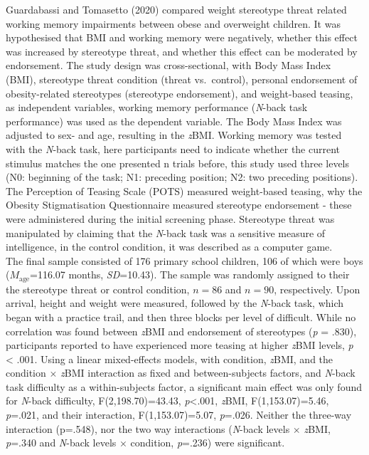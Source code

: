 \documentclass[
  stu,floatsintext]{apa7}
\begin{document}
Guardabassi and Tomasetto (2020) compared weight stereotype threat related working memory impairments between obese and overweight children.
It was hypothesised that BMI and working memory were negatively, whether this effect was increased by stereotype threat, and whether this effect can be moderated by endorsement.
The study design was cross-sectional, with Body Mass Index (BMI), stereotype threat condition (threat vs.~control), personal endorsement of obesity-related stereotypes (stereotype endorsement), and weight-based teasing, as independent variables, working memory performance (\emph{N}-back task performance) was used as the dependent variable.
The Body Mass Index was adjusted to sex- and age, resulting in the \emph{z}BMI.
Working memory was tested with the \emph{N}-back task, here participants need to indicate whether the current stimulus matches the one presented n trials before, this study used three levels (N0: beginning of the task; N1: preceding position; N2: two preceding positions).
The Perception of Teasing Scale (POTS) measured weight-based teasing, why the Obesity Stigmatisation Questionnaire measured stereotype endorsement - these were administered during the initial screening phase.
Stereotype threat was manipulated by claiming that the \emph{N}-back task was a sensitive measure of intelligence, in the control condition, it was described as a computer game.\\
The final sample consisted of 176 primary school children, 106 of which were boys (\(M_{\text{age}}\)=116.07 months, \emph{SD}=10.43).
The sample was randomly assigned to their the stereotype threat or control condition, \(n=86\) and \(n=90\), respectively.
Upon arrival, height and weight were measured, followed by the \emph{N}-back task, which began with a practice trail, and then three blocks per level of difficult.
While no correlation was found between \emph{z}BMI and endorsement of stereotypes (\emph{p} = .830), participants reported to have experienced more teasing at higher \emph{z}BMI levels, \emph{p} \textless{} .001.
Using a linear mixed-effects models, with condition, \emph{z}BMI, and the condition \(\times\) \emph{z}BMI interaction as fixed and between-subjects factors, and \emph{N}-back task difficulty as a within-subjects factor, a significant main effect was only found for \emph{N}-back difficulty, F(2,198.70)=43.43, \emph{p}\textless.001, \emph{z}BMI, F(1,153.07)=5.46, \emph{p}=.021, and their interaction, F(1,153.07)=5.07, \emph{p}=.026.
Neither the three-way interaction (p=.548), nor the two way interactions (\emph{N}-back levels \(\times\) \emph{z}BMI, \emph{p}=.340 and \emph{N}-back levels \(\times\) condition, \emph{p}=.236) were significant.
\end{document}

